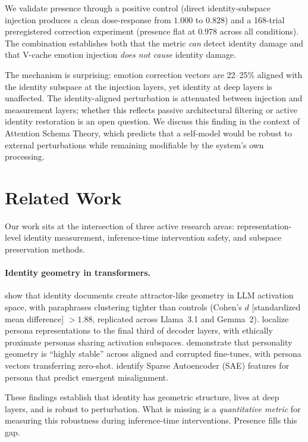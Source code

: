 \documentclass[11pt,a4paper]{article}
\begin{document}
We validate presence through a positive control (direct identity-subspace
injection produces a clean dose-response from $1.000$ to $0.828$) and a
168-trial preregistered correction experiment (presence flat at $0.978$
across all conditions). The combination establishes both that the metric
\emph{can} detect identity damage and that V-cache emotion injection
\emph{does not cause} identity damage.

The mechanism is surprising: emotion correction vectors are 22--25\%
aligned with the identity subspace at the injection layers, yet identity at
deep layers is unaffected. The identity-aligned perturbation is attenuated
between injection and measurement layers; whether this reflects passive
architectural filtering or active identity restoration is an open question.
We discuss this finding in the context of Attention Schema Theory, which
predicts that a self-model would be robust to external perturbations while
remaining modifiable by the system's own processing.

\section{Related Work}
\label{sec:related}

Our work sits at the intersection of three active research areas:
representation-level identity measurement, inference-time intervention
safety, and subspace preservation methods.

\paragraph{Identity geometry in transformers.}
\citet{vasilenko2026identity} show that identity documents create
attractor-like geometry in LLM activation space, with paraphrases clustering
tighter than controls (Cohen's $d$ [standardized mean difference] $> 1.88$, replicated across Llama~3.1 and
Gemma~2). \citet{cintas2025localizing} localize persona representations to
the final third of decoder layers, with ethically proximate personas sharing
activation subspaces. \citet{aneja2026intrinsic} demonstrate that personality
geometry is ``highly stable'' across aligned and corrupted fine-tunes, with
persona vectors transferring zero-shot. \citet{wang2025persona} identify
Sparse Autoencoder (SAE) features for persona that predict emergent misalignment.

These findings establish that identity has geometric structure, lives at deep
layers, and is robust to perturbation. What is missing is a
\emph{quantitative metric} for measuring this robustness during inference-time
interventions. Presence fills this gap.
\end{document}
